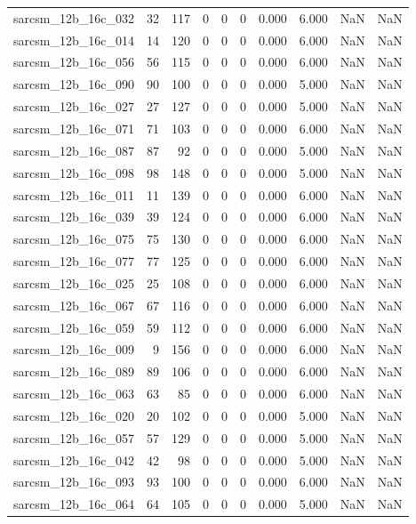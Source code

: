 \documentclass{article}
\begin{document}
\begin{longtable}{lrrrrrrrrr}
sarcsm\_12b\_16c\_032 & 32 & 117 & 0 & 0 & 0 & 0.000 & 6.000 & NaN & NaN \\
sarcsm\_12b\_16c\_014 & 14 & 120 & 0 & 0 & 0 & 0.000 & 6.000 & NaN & NaN \\
sarcsm\_12b\_16c\_056 & 56 & 115 & 0 & 0 & 0 & 0.000 & 6.000 & NaN & NaN \\
sarcsm\_12b\_16c\_090 & 90 & 100 & 0 & 0 & 0 & 0.000 & 5.000 & NaN & NaN \\
sarcsm\_12b\_16c\_027 & 27 & 127 & 0 & 0 & 0 & 0.000 & 5.000 & NaN & NaN \\
sarcsm\_12b\_16c\_071 & 71 & 103 & 0 & 0 & 0 & 0.000 & 6.000 & NaN & NaN \\
sarcsm\_12b\_16c\_087 & 87 & 92 & 0 & 0 & 0 & 0.000 & 5.000 & NaN & NaN \\
sarcsm\_12b\_16c\_098 & 98 & 148 & 0 & 0 & 0 & 0.000 & 5.000 & NaN & NaN \\
sarcsm\_12b\_16c\_011 & 11 & 139 & 0 & 0 & 0 & 0.000 & 6.000 & NaN & NaN \\
sarcsm\_12b\_16c\_039 & 39 & 124 & 0 & 0 & 0 & 0.000 & 6.000 & NaN & NaN \\
sarcsm\_12b\_16c\_075 & 75 & 130 & 0 & 0 & 0 & 0.000 & 6.000 & NaN & NaN \\
sarcsm\_12b\_16c\_077 & 77 & 125 & 0 & 0 & 0 & 0.000 & 6.000 & NaN & NaN \\
sarcsm\_12b\_16c\_025 & 25 & 108 & 0 & 0 & 0 & 0.000 & 6.000 & NaN & NaN \\
sarcsm\_12b\_16c\_067 & 67 & 116 & 0 & 0 & 0 & 0.000 & 6.000 & NaN & NaN \\
sarcsm\_12b\_16c\_059 & 59 & 112 & 0 & 0 & 0 & 0.000 & 6.000 & NaN & NaN \\
sarcsm\_12b\_16c\_009 & 9 & 156 & 0 & 0 & 0 & 0.000 & 6.000 & NaN & NaN \\
sarcsm\_12b\_16c\_089 & 89 & 106 & 0 & 0 & 0 & 0.000 & 6.000 & NaN & NaN \\
sarcsm\_12b\_16c\_063 & 63 & 85 & 0 & 0 & 0 & 0.000 & 6.000 & NaN & NaN \\
sarcsm\_12b\_16c\_020 & 20 & 102 & 0 & 0 & 0 & 0.000 & 5.000 & NaN & NaN \\
sarcsm\_12b\_16c\_057 & 57 & 129 & 0 & 0 & 0 & 0.000 & 5.000 & NaN & NaN \\
sarcsm\_12b\_16c\_042 & 42 & 98 & 0 & 0 & 0 & 0.000 & 5.000 & NaN & NaN \\
sarcsm\_12b\_16c\_093 & 93 & 100 & 0 & 0 & 0 & 0.000 & 6.000 & NaN & NaN \\
sarcsm\_12b\_16c\_064 & 64 & 105 & 0 & 0 & 0 & 0.000 & 5.000 & NaN & NaN \\

\end{longtable}
\end{document}
